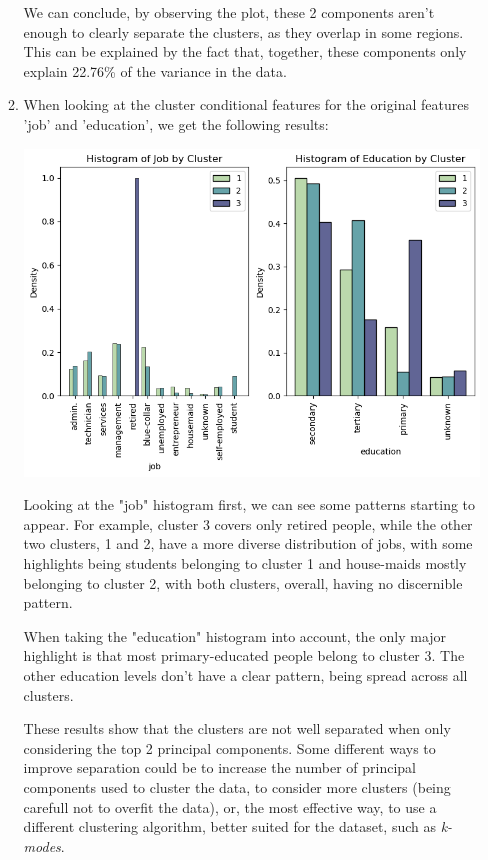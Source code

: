 \documentclass[12pt]{article}
\begin{document}
\begin{enumerate}[leftmargin=0pt, label=\textbf{\arabic*.)},start=1]
\begin{enumerate}[leftmargin=0pt, label=\textbf{\alph*.)}]
                    We can conclude, by observing the plot, these 2 components aren't enough to clearly separate the clusters, as they overlap in some regions. This can be explained by the fact that, together, these components only explain 22.76\% of the variance in the data.

              \item When looking at the cluster conditional features for the original features 'job' and 'education', we get the following results:

                    \begin{center}
                        \includegraphics{cluster_conditional_features_job_education.png}
                    \end{center}

                    Looking at the "job" histogram first, we can see some patterns starting to appear. For example, cluster 3 covers only retired people, while the other two clusters, 1 and 2, have a more diverse distribution of jobs, with some highlights being students belonging to cluster 1 and house-maids mostly belonging to cluster 2, with both clusters, overall, having no discernible pattern.

                    When taking the "education" histogram into account, the only major highlight is that most primary-educated people belong to cluster 3. The other education levels don't have a clear pattern, being spread across all clusters.

                    These results show that the clusters are not well separated when only considering the top 2 principal components. Some different ways to improve separation could be to increase the number of principal components used to cluster the data, to consider more clusters (being carefull not to overfit the data), or, the most effective way, to use a different clustering algorithm, better suited for the dataset, such as \textit{k-modes}.
          \end{enumerate}
\end{enumerate}
\newpage
\appendix
\end{document}
